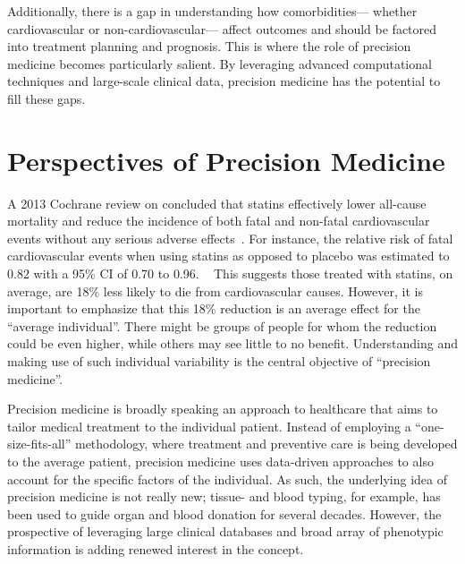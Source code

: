 Additionally, there is a gap in understanding how comorbidities---%
whether cardiovascular or non-cardiovascular---%
affect outcomes and should be factored into treatment planning and prognosis.%
This is where the role of precision medicine becomes particularly salient. 
By leveraging advanced computational techniques and large-scale clinical data,
precision medicine has the potential to fill these gaps.

\section{Perspectives of Precision Medicine}

A 2013 Cochrane review on  concluded 
that statins effectively lower all-cause mortality and reduce the incidence
of both fatal and non-fatal cardiovascular events without any serious
adverse effects~\autocite{taylorStatins2013}.
For instance, the relative risk of fatal cardiovascular events 
when using statins as opposed to placebo
was estimated to \num{0.82} with a 
\si{95}{\%} \ac{CI} of \num{0.70} to \num{0.96}.
~\autocite{taylorStatins2013}
This suggests those treated with statins, on average,
are \si{18}{\%} less likely to die from cardiovascular causes. 
However, it is important to emphasize that this \si{18}{\%} 
reduction is an average effect for the \enquote{average individual}.
There might be groups of people for whom the reduction could be 
even higher, while others may see little to no benefit. 
Understanding and making use of such individual variability 
is the central objective of \enquote{precision medicine}.

Precision medicine is broadly speaking an approach to healthcare 
that aims to tailor medical treatment to the individual patient.
Instead of employing a \enquote{one-size-fits-all} methodology, 
where treatment and preventive care is being developed to the average patient,
precision medicine uses data-driven approaches to also account for 
the specific factors of the individual.
As such, the underlying idea of precision medicine is not really new;
tissue- and blood typing, for example,  
has been used to guide organ and blood donation for several decades.
However, the prospective of leveraging large clinical databases
and broad array of phenotypic information is adding renewed interest 
in the concept.
~\autocite{collinsNew2015}

